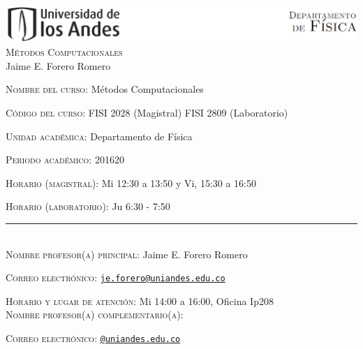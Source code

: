 \documentclass[letterpaper,10pt,onecolumn]{article}
\begin{document}
\begin{center}

\includegraphics[width=490pt]{header.png}\\[0.5cm]

\textsc{\LARGE M\'etodos Computacionales}\\[0.1cm]
\large Jaime E. Forero Romero\\[0.5cm]

\end{center}

\large \noindent\textsc{Nombre del curso:}  M\'etodos Computacionales%
  
\noindent\textsc{C\'odigo del curso:} FISI 2028 (Magistral) FISI 2809 (Laboratorio) %

\noindent\textsc{Unidad acad\'emica:} Departamento de F\'isica

\noindent\textsc{Periodo acad\'emico:} 201620 %

\noindent\textsc{Horario (magistral):} Mi 12:30 a 13:50 y Vi, 15:30 a
16:50 %

\noindent\textsc{Horario (laboratorio):} Ju 6:30 - 7:50

\noindent\rule{\textwidth}{1pt}\\[-0.3cm]

\normalsize \noindent\textsc{Nombre profesor(a) principal:} Jaime
E. Forero Romero%

\noindent\textsc{Correo electr\'onico:}
\href{mailto:je.forero@uniandes.edu.co}{\nolinkurl{je.forero@uniandes.edu.co}}

\noindent\textsc{Horario y lugar de atenci\'on:} Mi 14:00 a 16:00, Oficina Ip208 
\\[-0.1cm]

\noindent\textsc{Nombre profesor(a) complementario(a):} %

\noindent\textsc{Correo electr\'onico:}
\href{mailto:@uniandes.edu.co}{\nolinkurl{@uniandes.edu.co}}
\end{document}
